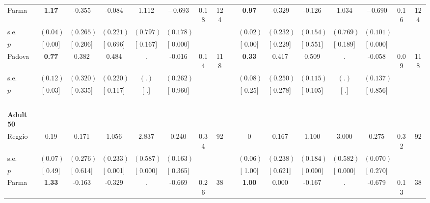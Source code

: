 \begin{longtable}{L{8em} c c c c c c c p{1em} c c c c c c c}
\quad \quad \quad Parma& \textbf{     1.17} &    -0.355 &    -0.084 &     1.112 & $ \mathbf{   -0.693}$ &      0.18 &       124 & & \textbf{     0.97} &    -0.329 &    -0.126 &     1.034 & $ \mathbf{   -0.690}$ &      0.16 &       124  \\*
\quad \quad \quad \quad s.e.& $ (     0.04)$ & $ (    0.265)$ & $ (    0.221)$ & $ (    0.797)$ & $ (    0.178)$ & & & & $ (     0.02)$ & $ (    0.232)$ & $ (    0.154)$ & $ (    0.769)$ & $ (    0.101)$ & &  \\*
\quad \quad \quad \quad $ p$ & [     0.00] & [    0.206] & [    0.696] & [    0.167] & [    0.000] & & & & [     0.00] & [    0.229] & [    0.551] & [    0.189] & [    0.000] & &  \\[1em]
\quad \quad \quad Padova& \textbf{     0.77} &     0.382 &     0.484 &         . &    -0.016 &      0.14 &       118 & & \textbf{     0.33} &     0.417 &     0.509 &         . &    -0.058 &      0.09 &       118  \\*
\quad \quad \quad \quad s.e.& $ (     0.12)$ & $ (    0.320)$ & $ (    0.220)$ & $ (        .)$ & $ (    0.262)$ & & & & $ (     0.08)$ & $ (    0.250)$ & $ (    0.115)$ & $ (        .)$ & $ (    0.137)$ & &  \\*
\quad \quad \quad \quad $ p$ & [     0.03] & [    0.335] & [    0.117] & [        .] & [    0.960] & & & & [     0.25] & [    0.278] & [    0.105] & [        .] & [    0.856] & &  \\[1em]
~\\[1em]
\quad \quad \textbf{Adult 50} & & & & & & & & & & & & & & & \\* 
\quad \quad \quad Reggio& 0.19 &     0.171 & $ \mathbf{    1.056}$ & $ \mathbf{    2.837}$ &     0.240 &      0.34 &        92 & & 0 &     0.167 & $ \mathbf{    1.100}$ & $ \mathbf{    3.000}$ &     0.275 &      0.32 &        92  \\*
\quad \quad \quad \quad s.e.& $ (     0.07)$ & $ (    0.276)$ & $ (    0.233)$ & $ (    0.587)$ & $ (    0.163)$ & & & & $ (     0.06)$ & $ (    0.238)$ & $ (    0.184)$ & $ (    0.582)$ & $ (    0.070)$ & &  \\*
\quad \quad \quad \quad $ p$ & [     0.49] & [    0.614] & [    0.001] & [    0.000] & [    0.365] & & & & [     1.00] & [    0.621] & [    0.000] & [    0.000] & [    0.270] & &  \\[1em]
\quad \quad \quad Parma& \textbf{     1.33} &    -0.163 &    -0.329 &         . &    -0.669 &      0.26 &        38 & & \textbf{     1.00} &     0.000 &    -0.167 &         . &    -0.679 &      0.13 &        38  \\*

\end{longtable}
